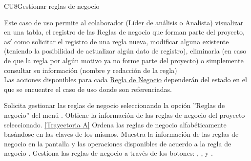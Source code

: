 	\begin{UseCase}{CU8}{Gestionar reglas de negocio}{
			
			Este caso de uso permite al colaborador (\hyperlink{jefe}{Líder de análisis} o \hyperlink{analista}{Analista}) visualizar en una tabla, el registro de las Reglas de negocio que forman parte del proyecto, así como solicitar el registro de una regla nueva, modificar alguna existente (teniendo la posibilidad de actualizar algún dato de registro), eliminarla (en caso de que la regla por algún motivo ya no forme parte del proyecto) o simplemente consultar su información  (nombre y redacción de la regla) \\
			Las acciones disponibles para cada \hyperlink{BREntidad}{Regla de Negocio} dependerán del estado en el que se encuentre el caso de uso donde son referenciadas. 
			
	}
	
\end{UseCase}
\begin{UCtrayectoria}
	\UCpaso[\UCactor] Solicita gestionar las reglas de negocio seleccionando la opción ''Reglas de negocio'' del menú .
	\UCpaso[\UCsist] Obtiene la información de las reglas de negocio del proyecto seleccionado. \hyperlink{CU8:TAA}{[Trayectoria A]}
	\UCpaso[\UCsist] Ordena las reglas de negocio alfabéticamente basándose en las claves de los mismos.
	\UCpaso[\UCsist] Muestra la información de las reglas de negocio en la pantalla  y las operaciones disponibles de acuerdo a la regla de negocio .\label{CU8-P4}
	\UCpaso[\UCactor] Gestiona las reglas de negocio a través de los botones: , \editar , \eliminar y . 
\end{UCtrayectoria}		
